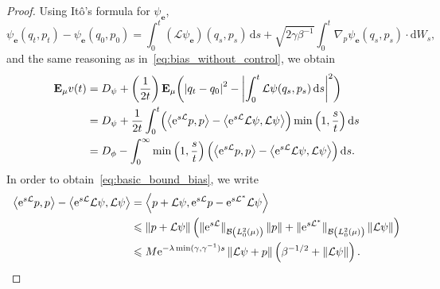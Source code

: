 \documentclass[11pt,a4paper]{article}
\newcommand{\e}{\mathrm{e}}
\newcommand{\expect}[0]{\mathbf{E}}
\newcommand{\grad}{\nabla}
\newcommand{\vect}[1]{\boldsymbol{\mathbf #1}}
\renewcommand{\d}{\mathrm d}
\theoremstyle{plain}
\numberwithin{equation}{section}
\renewcommand{\leq}{\leqslant}
\begin{document}
\begin{proof}
Using Itô's formula for $\psi_{\vect e}$,
\[
    \psi_{\vect e}(q_t, p_t) - \psi_{\vect e}(q_0, p_0)
    = \int_{0}^{t} (\mathcal L \psi_{\vect e}) (q_s, p_s) \, \d s + \sqrt{2 \gamma \beta^{-1}} \int_{0}^{t} \grad_p \psi_{\vect e} (q_s, p_s) \cdot \d W_s,
\]
and the same reasoning as in~\eqref{eq:bias_without_control},
we obtain
\begin{align*}
    \expect_{\mu} v(t)
    &= D_{\psi} + \left( \frac{1}{2t} \right) \expect_{\mu} \biggl( \abs{q_t - q_0}^2 - \biggl| \int_0^t {\mathcal L \psi}(q_s, p_s) \, \d s \biggr|^2 \biggr) \\
    &= D_{\psi} +  \frac{1}{2t}  \int_{0}^{t} \Bigl( \ip{\e^{s \mathcal L}p}{p} - \ip{\e^{s \mathcal L} \mathcal L \psi}{\mathcal L \psi} \Bigr) \min\left(1, \frac{s}{t}\right) \d s \\
    &= D_{\phi} - \int_{0}^{\infty} \min\left(1, \frac{s}{t}\right) \Bigl( \ip{\e^{s \mathcal L}p}{p} - \ip{\e^{s \mathcal L} \mathcal L \psi}{\mathcal L \psi} \Bigr) \, \d s.
\end{align*}
In order to obtain~\eqref{eq:basic_bound_bias}, we write
\begin{align*}
     \ip{\e^{s \mathcal L}p}{p} - \ip{\e^{s \mathcal L} \mathcal L \psi}{\mathcal L \psi}
    &= \ip{p + \mathcal L \psi}{\e^{s \mathcal L} p - \e^{s \mathcal L^*} \mathcal  L\psi} \\
    &\leq \norm{p + \mathcal L \psi}
    \left( \norm*{\e^{s \mathcal L}}[\mathcal B\left(L^2_0(\mu) \right)] \norm{p} + \norm*{\e^{s \mathcal L^*}}[\mathcal B\left(L^2_0(\mu) \right)] \norm{\mathcal L \psi} \right) \\
    &\leq M \e^{- \lambda \min(\gamma, \gamma^{-1}) s} \norm{\mathcal L\psi + p}  \left(\beta^{-1/2} + \norm{\mathcal L \psi} \right).
\end{align*}


\end{proof}
\end{document}
